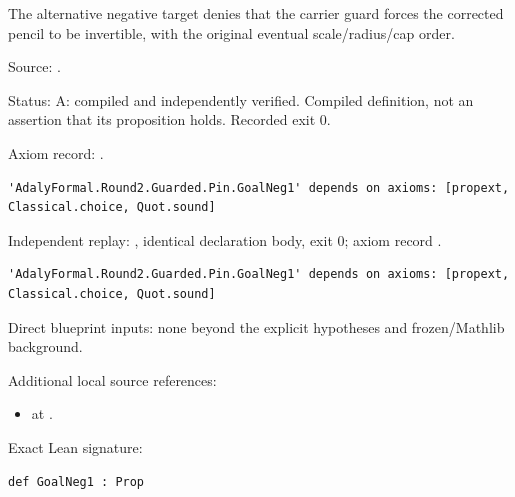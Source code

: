 \begin{definition}[bp-002]
\label{bp-002}
\uses{}
\leanok
The alternative negative target denies that the carrier guard forces the corrected pencil to be invertible, with the original eventual scale/radius/cap order.

\par Source: \texttt{}.
\par Status: A: compiled and independently verified. Compiled definition, not an assertion that its proposition holds. Recorded exit 0.
\par Axiom record: \texttt{}.
\begin{verbatim}
'AdalyFormal.Round2.Guarded.Pin.GoalNeg1' depends on axioms: [propext, Classical.choice, Quot.sound]
\end{verbatim}
\par Independent replay: \texttt{}, identical declaration body, exit 0; axiom record \texttt{}.
\begin{verbatim}
'AdalyFormal.Round2.Guarded.Pin.GoalNeg1' depends on axioms: [propext, Classical.choice, Quot.sound]
\end{verbatim}
\par Direct blueprint inputs: none beyond the explicit hypotheses and frozen/Mathlib background.
\par Additional local source references:
\begin{itemize}
\item \texttt{} at \texttt{}.
\end{itemize}
\par Exact Lean signature:
\begin{verbatim}
def GoalNeg1 : Prop
\end{verbatim}
\end{definition}

